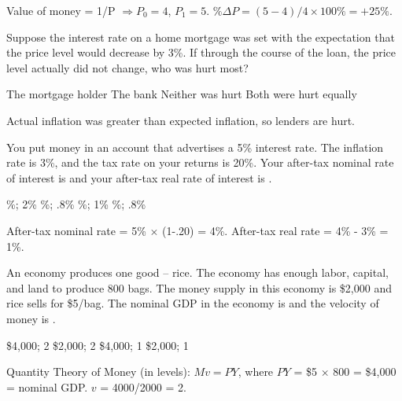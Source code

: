 \documentclass[addpoints,11pt]{exam}
\theoremstyle{definition}
\newcommand{\blank}[0]{\underline{\hspace{3cm}}}
\begin{document}
\begin{questions}
\begin{solution}
	Value of money = 1/P $\Rightarrow P_0 = 4$, $P_1 = 5$. $\%\Delta P = (5-4)/4 \times 100\% = +25\%$.
\end{solution}

\question Suppose the interest rate on a home mortgage was set with the expectation that the price level would decrease by 3\%. If through the course of the loan, the price level actually did not change, who was hurt most?

\begin{choices}
	\choice The mortgage holder
	\CorrectChoice The bank
	\choice Neither was hurt
	\choice Both were hurt equally
\end{choices}

\begin{solution}
	Actual inflation was greater than expected inflation, so lenders are hurt.
\end{solution}

\question You put money in an account that advertises a 5\% interest rate. The inflation rate is 3\%, and the tax rate on your returns is 20\%. Your after-tax nominal rate of interest is \blank and your after-tax real rate of interest is \blank.

\begin{choices}
	\%; 2\%
	\%; .8\%
	\%; 1\%
	\%; .8\%
\end{choices}

\begin{solution}
	After-tax nominal rate = 5\% $\times$ (1-.20) = 4\%. After-tax real rate = 4\% - 3\% = 1\%.
\end{solution}

\question An economy produces one good -- rice. The economy has enough labor, capital, and land to produce 800 bags. The money supply in this economy is \$2,000 and rice sells for \$5/bag. The nominal GDP in the economy is \blank and the velocity of money is \blank.

\begin{choices}
	\CorrectChoice \$4,000; 2
	\choice \$2,000; 2
	\choice \$4,000; 1
	\choice \$2,000; 1
\end{choices}

\begin{solution}
	Quantity Theory of Money (in levels): $Mv=PY$, where $PY$ = \$5 $\times$ 800 = \$4,000 = nominal GDP. $v$ = 4000/2000 = 2.
\end{solution}

\newpage


\end{questions}
\end{document}
